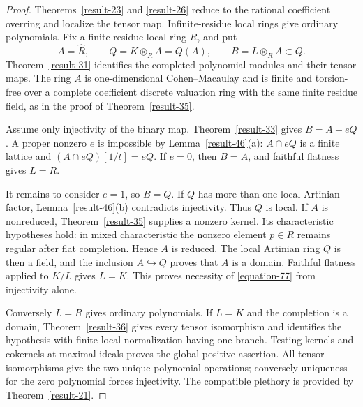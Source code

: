 \documentclass[11pt,a4paper]{article}
\theoremstyle{definition}
\begin{document}
\begin{proof}
Theorems~\ref{result-23} and \ref{result-26} reduce to the rational
coefficient overring and localize the tensor map. Infinite-residue
local rings give ordinary polynomials. Fix a finite-residue local
ring $R$, and put
\[
 A=\widehat R,\qquad Q=K\otimes_R A=Q(A),\qquad
 B=L\otimes_R A\subset Q.
\]
Theorem~\ref{result-31} identifies the completed polynomial modules
and their tensor maps. The ring $A$ is one-dimensional
Cohen--Macaulay and is finite and torsion-free over a complete
coefficient discrete valuation ring with the same finite residue
field, as in the proof of Theorem~\ref{result-35}.

Assume only injectivity of the binary map. Theorem~\ref{result-33}
gives $B=A+eQ$. A proper nonzero $e$ is impossible by
Lemma~\ref{result-46}(a): $A\cap eQ$ is a finite lattice and
$(A\cap eQ)[1/t]=eQ$. If $e=0$, then $B=A$, and faithful
flatness gives $L=R$.

It remains to consider $e=1$, so $B=Q$. If $Q$ has more than one
local Artinian factor, Lemma~\ref{result-46}(b) contradicts
injectivity. Thus $Q$ is local. If $A$ is nonreduced,
Theorem~\ref{result-35} supplies a nonzero kernel. Its characteristic
hypotheses hold: in mixed characteristic the nonzero element
$p\in R$ remains regular after flat completion. Hence $A$ is
reduced. The local Artinian ring $Q$ is then a field, and the
inclusion $A\hookrightarrow Q$ proves that $A$ is a domain.
Faithful flatness applied to $K/L$ gives $L=K$.
This proves necessity of \eqref{equation-77} from injectivity alone.

Conversely $L=R$ gives ordinary polynomials. If $L=K$ and the
completion is a domain, Theorem~\ref{result-36} gives every tensor
isomorphism and identifies the hypothesis with finite local
normalization having one branch. Testing kernels and cokernels
at maximal ideals proves the global positive assertion.
All tensor isomorphisms give the two unique polynomial operations;
conversely uniqueness for the zero polynomial forces injectivity.
The compatible plethory is provided by Theorem~\ref{result-21}.
\end{proof}
\end{document}
